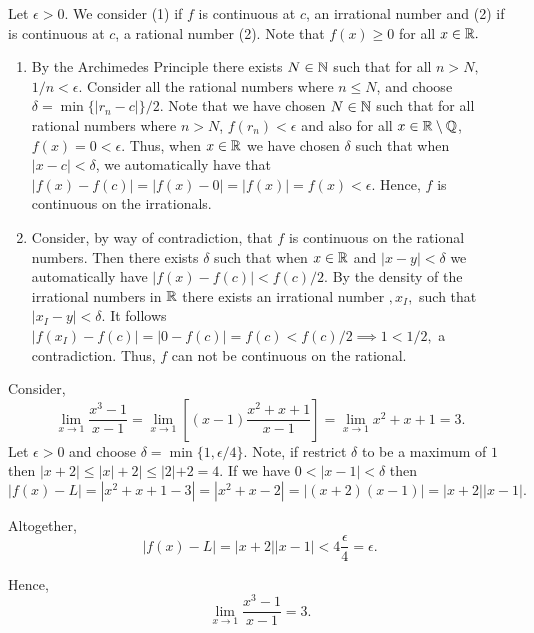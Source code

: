 \documentclass{report}
\begin{document}
\begin{myproof}

  Let $\epsilon > 0.$ We consider (1) if $f$ is continuous at $c$, an irrational number and (2) if is continuous at $c$, a rational number (2). Note that $f(x) \geq0 $ for all $x \in \RR.$

  \begin{enumerate}
    \item 
  By the Archimedes Principle there exists $N \in \NN$ such that for all $n>N,$ $1/n < \epsilon.$ Consider all the rational numbers where $n\leq N$, and choose $\delta = \min\{|r_n - c|\}/2$.  Note that we have chosen $N\in\NN$ such that for all rational numbers where $n>N$, $f(r_n)< \epsilon$ and also for all $x \in \RR \setminus \QQ$, $f(x)=0< \epsilon.$ Thus, when $x\in \RR$ we have chosen $\delta$ such that when $|x-c|< \delta$, we automatically have that $|f(x) - f(c)|= |f(x) - 0| = |f(x)| = f(x)<\epsilon.$ Hence, $f$ is continuous on the irrationals.
\item Consider, by way of contradiction, that $f$ is continuous on the rational numbers. Then there exists $\delta$ such that when $x\in \RR$ and $|x-y| <\delta$ we automatically have $|f(x) - f(c)| < f(c)/2.$ By the density of the irrational numbers in $\RR$ there exists an irrational number $,x_I,$ such that $|x_I - y| < \delta.$ It follows $|f(x_I) - f(c)|= |0 - f(c)| = f(c) < f(c)/2 \implies 1 < 1/2,$ a contradiction. Thus, $f$ can not be continuous on the rational.
      
  \end{enumerate}

    
\end{myproof}

\begin{myproof}
  Consider,
  $$ \lim _{x \rightarrow 1} \frac{x^3-1}{x-1}= \lim _{x \rightarrow 1}\left[ (x-1)\frac{x^2+x+1}{x-1}\right]= \lim _{x \rightarrow 1}x^2+x+1 = 3.$$ Let $\epsilon >0$ and choose $\delta = \min\{1,\epsilon/4\}$. Note, if restrict $\delta$ to be a maximum of $1$ then $|x+2| \leq |x| + 2 | \leq |2| + 2 = 4.$
 If we have $0<|x-1| < \delta$ then $$|f(x) - L|= |x^2 +x +1 - 3| = |x^2 +x- 2|= |(x+2)(x-1)| = |x+2||x-1|.$$


Altogether, $$|f(x) - L| = |x+2||x-1|<4  \frac{\epsilon}{4}= \epsilon.$$

Hence, 
$$\lim _{x \rightarrow 1} \frac{x^3-1}{x-1}=3.$$

\end{myproof}
\end{document}
